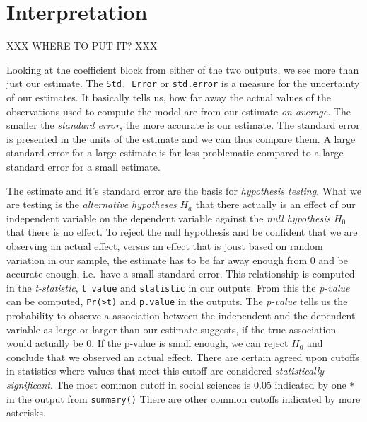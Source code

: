 \documentclass[
]{book}
\begin{document}
\hypertarget{interpretation}{%
\section{Interpretation}\label{interpretation}}

XXX WHERE TO PUT IT? XXX

Looking at the coefficient block from either of the two outputs, we see more
than just our estimate. The \texttt{Std.\ Error} or \texttt{std.error} is a measure for the
uncertainty of our estimates. It basically tells us, how far away the actual
values of the observations used to compute the model are from our estimate
\emph{on average}. The smaller the \emph{standard error}, the more accurate is our
estimate. The standard error is presented in the units of the estimate and we
can thus compare them. A large standard error for a large estimate is far less
problematic compared to a large standard error for a small estimate.

The estimate and it's standard error are the basis for \emph{hypothesis testing}.
What we are testing is the \emph{alternative hypotheses} \(H_a\) that there actually
is an effect of our independent variable on the dependent variable against the
\emph{null hypothesis} \(H_0\) that there is no effect. To reject the null hypothesis
and be confident that we are observing an actual effect, versus an effect that
is joust based on random variation in our sample, the estimate has to be far
away enough from \(0\) and be accurate enough, i.e.~have a small standard error.
This relationship is computed in the \emph{t-statistic}, \texttt{t\ value} and \texttt{statistic} in
our outputs. From this the \emph{p-value} can be computed, \texttt{Pr(\textgreater{}\textbar{}t\textbar{})} and \texttt{p.value}
in the outputs. The \emph{p-value} tells us the probability to observe a association
between the independent and the dependent variable as large or larger than our
estimate suggests, if the true association would actually be \(0\). If the p-value
is small enough, we can reject \(H_0\) and conclude that we observed an actual
effect. There are certain agreed upon cutoffs in statistics where values that
meet this cutoff are considered \emph{statistically significant}. The most common
cutoff in social sciences is \(0.05\) indicated by one \texttt{*} in the output from
\texttt{summary()} There are other common cutoffs indicated by more asterisks.
\end{document}
